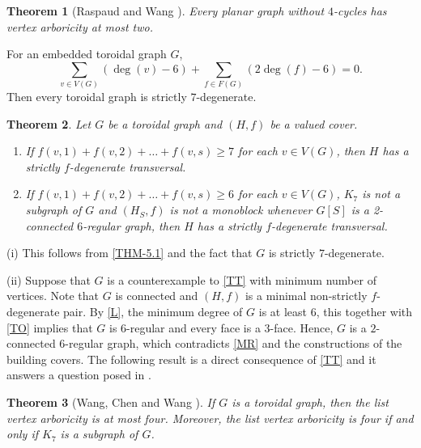\documentclass{article}
\makeatletter
\renewenvironment{proof}[1][\proofname]{\par
  \pushQED{\qed}%
  \normalfont \topsep6\p@\@plus6\p@\relax
  \trivlist
  \item[\hskip\labelsep
        \bfseries
    #1\@addpunct{.}]\ignorespaces
}{%
  \popQED\endtrivlist\@endpefalse
}
\newtheorem{theorem}{Theorem}[section]
\theoremstyle{definition}
\makeatother
\begin{document}
\begin{theorem}[Raspaud and Wang \cite{MR2408378}]\label{NO4}
Every planar graph without $4$-cycles has vertex arboricity at most two. 
\end{theorem}

For an embedded toroidal graph $G$, 
\begin{equation}\label{TO}
\sum_{v \in V(G)} (\deg(v) - 6) + \sum_{f \in F(G)} (2\deg(f) - 6) = 0. \tag{$\ast\ast$}
\end{equation}
Then every toroidal graph is strictly $7$-degenerate. 
\begin{theorem}\label{TT}
Let $G$ be a toroidal graph and $(H, f)$ be a valued cover. 
\begin{enumerate}[label = (\roman*)]
\item If $f(v, 1) + f(v, 2) + \dots + f(v, s) \geq 7$ for each $v \in V(G)$, then $H$ has a strictly $f$-degenerate transversal. 
\item If $f(v, 1) + f(v, 2) + \dots + f(v, s) \geq 6$ for each $v \in V(G)$, $K_{7}$ is not a subgraph of $G$ and $(H_{S}, f)$ is not a monoblock whenever $G[S]$ is a 2-connected $6$-regular graph, then $H$ has a strictly $f$-degenerate transversal. 
\end{enumerate}
\end{theorem}
\begin{proof}
(i) This follows from \autoref{THM-5.1} and the fact that $G$ is strictly $7$-degenerate. 

(ii) Suppose that $G$ is a counterexample to \autoref{TT} with minimum number of vertices. Note that $G$ is connected and $(H, f)$ is a minimal non-strictly $f$-degenerate pair. By \autoref{L}, the minimum degree of $G$ is at least $6$, this together with \eqref{TO} implies that $G$ is $6$-regular and every face is a $3$-face. Hence, $G$ is a $2$-connected $6$-regular graph, which contradicts \autoref{MR} and the constructions of the building covers. 
\end{proof}
The following result is a direct consequence of \autoref{TT} and it answers a question posed in \cite{MR3508765}. 
\begin{theorem}[Wang, Chen and Wang \cite{MR3862632}]
If $G$ is a toroidal graph, then the list vertex arboricity is at most four. Moreover, the list vertex arboricity is four if and only if $K_{7}$ is a subgraph of $G$. 
\end{theorem}
\end{document}
